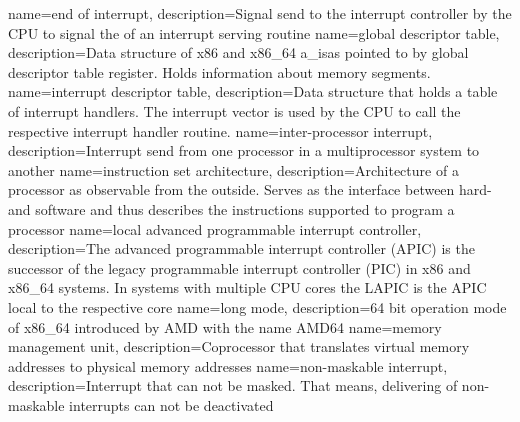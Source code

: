 
%
{
    name=end of interrupt,
    description={Signal send to the interrupt controller by the CPU to signal the of an interrupt serving routine}
}
%
{
    name=global descriptor table,
    description={Data structure of x86 and x86\_64 \acrshort{a_isa}s pointed to by global descriptor table register.
            Holds information about memory segments.}
}
%
{
    name=interrupt descriptor table,
    description={Data structure that holds a table of interrupt handlers. The interrupt vector is used by the CPU to
            call the respective interrupt handler routine.}
}
{
    name=inter-processor interrupt,
    description={Interrupt send from one processor in a multiprocessor system to another}
}
{
    name=instruction set architecture,
    description={Architecture of a processor as observable from the outside. Serves as the interface between hard- and
            software and thus describes the instructions supported to program a processor}
}
%
{
    name=local advanced programmable interrupt controller,
    description={The advanced programmable interrupt controller (APIC) is the successor of the legacy programmable
            interrupt controller (PIC) in x86 and x86\_64 systems. In systems with multiple CPU cores the LAPIC is the
            APIC local to the respective core}
}
{
    name=long mode,
    description={64 bit operation mode of x86\_64 introduced by AMD with the name AMD64}
}
%
{
    name=memory management unit,
    description={Coprocessor that translates virtual memory addresses to physical memory addresses}
}
%
{
    name=non-maskable interrupt,
    description={Interrupt that can not be masked. That means, delivering of non-maskable interrupts can not be
            deactivated}
}
